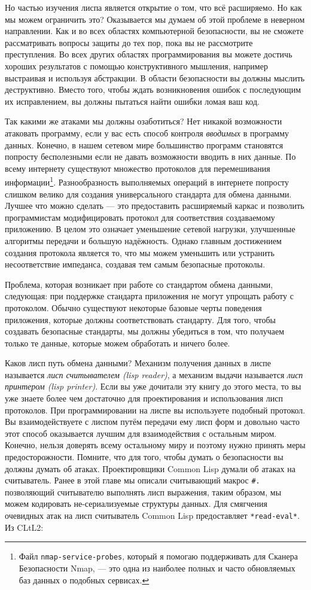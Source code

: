 Но частью изучения лиспа является открытие о том, что всё расширяемо. Но как мы можем ограничить это? Оказывается мы думаем об этой проблеме в неверном направлении. Как и во всех областях компьютерной безопасности, вы не сможете рассматривать вопросы защиты до тех пор, пока вы не рассмотрите преступления. Во всех других областях программирования вы можете достичь хороших результатов с помощью конструктивного мышления, например выстраивая и используя абстракции. В области безопасности вы должны мыслить деструктивно. Вместо того, чтобы ждать возникновения ошибок с последующим их исправлением, вы должны пытаться найти ошибки ломая ваш код.

Так какими же атаками мы должны озаботиться? Нет никакой возможности атаковать программу, если у вас есть способ контроля \emph{вводимых} в программу данных. Конечно, в нашем сетевом мире большинство программ становятся попросту бесполезными если не давать возможности вводить в них данные. По всему интернету существуют множество протоколов для перемешивания информации\footnote{Файл \verb"nmap-service-probes", который я помогаю поддерживать для Сканера Безопасности Nmap, --- это одна из наиболее полных и часто обновляемых баз данных о подобных сервисах.}. Разнообразность выполняемых операций в интернете попросту слишком велико для создания универсального стандарта для обмена данными. Лучшее что можно сделать --- это предоставить расширяемый каркас и позволить программистам модифицировать протокол для соответствия создаваемому приложению. В целом это означает уменьшение сетевой нагрузки, улучшенные алгоритмы передачи и большую надёжность. Однако главным достижением создания протокола является то, что мы можем уменьшить или устранить несоответствие импеданса, создавая тем самым безопасные протоколы.

Проблема, которая возникает при работе со стандартом обмена данными, следующая: при поддержке стандарта приложения не могут упрощать работу с протоколом. Обычно существуют некоторые базовые черты поведения приложения, которые должны соответствовать стандарту. Для того, чтобы создавать безопасные стандарты, мы должны убедиться в том, что получаем только те данные, которые можем обработать и ничего более.

Каков лисп путь обмена данными? Механизм получения данных в лиспе называется \emph{лисп считывателем (lisp reader)}, а механизм выдачи называется \emph{лисп принтером (lisp printer)}. Если вы уже дочитали эту книгу до этого места, то вы уже знаете более чем достаточно для проектирования и использования лисп протоколов. При программировании на лиспе вы используете подобный протокол. Вы взаимодействуете с лиспом путём передачи ему лисп форм и довольно часто этот способ оказывается лучшим для взаимодействия с остальным миром. Конечно, нельзя доверять всему остальному миру и поэтому нужно принять меры предосторожности. Помните, что для того, чтобы думать о безопасности вы должны думать об атаках. Проектировщики Common Lisp думали об атаках на считыватель. Ранее в этой главе мы описали считывающий макрос \verb"#." позволяющий считывателю выполнять лисп выражения, таким образом, мы можем кодировать не-сериализуемые структуры данных. Для смягчения очевидных атак на лисп считыватель Common Lisp предоставляет \verb"*read-eval*". Из CLtL2:

